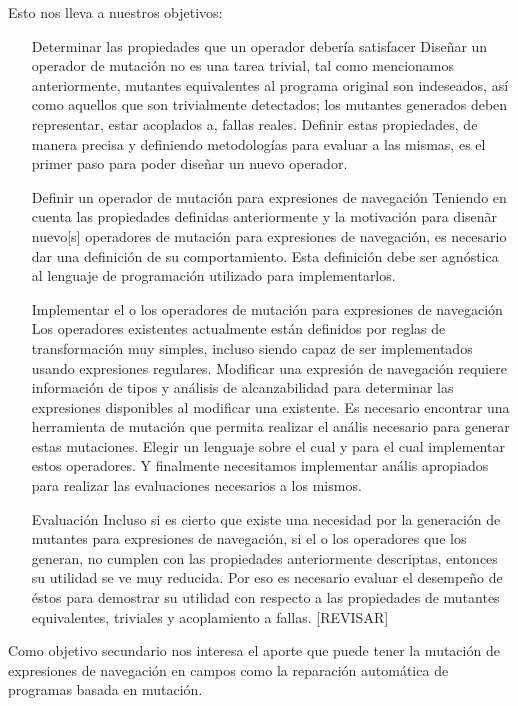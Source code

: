 Esto nos lleva a nuestros objetivos:

\begin{enumerate}[leftmargin=.75cm,align=left]
	\item[Determinar las propiedades que un operador deber\'ia satisfacer]
	Dise\~nar un operador de mutaci\'on no es una tarea trivial, tal como mencionamos anteriormente, mutantes equivalentes al programa original son indeseados, as\'i como aquellos que son trivialmente detectados; los mutantes generados deben representar, estar acoplados a, fallas reales. Definir estas propiedades, de manera precisa y definiendo metodolog\'ias para evaluar a las mismas, es el primer paso para poder dise\~nar un nuevo operador.
	\item[Definir un operador de mutaci\'on para expresiones de navegaci\'on]
	Teniendo en cuenta las propiedades definidas anteriormente y la motivaci\'on para disen\~ar nuevo[s] operadores de mutaci\'on para expresiones de navegaci\'on, es necesario dar una definici\'on de su comportamiento. Esta definici\'on debe ser agn\'ostica al lenguaje de programaci\'on utilizado para implementarlos.
	\item[Implementar el o los operadores de mutaci\'on para expresiones de navegaci\'on] Los operadores existentes actualmente est\'an definidos por reglas de transformaci\'on muy simples, incluso siendo capaz de ser implementados usando expresiones regulares. Modificar una expresi\'on de navegaci\'on requiere informaci\'on de tipos y an\'alisis de alcanzabilidad para determinar las expresiones disponibles al modificar una existente. Es necesario encontrar una herramienta de mutaci\'on que permita realizar el an\'alis necesario para generar estas mutaciones. Elegir un lenguaje sobre el cual y para el cual implementar estos operadores. Y finalmente necesitamos implementar an\'alis apropiados para realizar las evaluaciones necesarios a los mismos.
	\item[Evaluaci\'on]
	Incluso si es cierto que existe una necesidad por la generaci\'on de mutantes para expresiones de navegaci\'on, si el o los operadores que los generan, no cumplen con las propiedades anteriormente descriptas, entonces su utilidad se ve muy reducida. Por eso es necesario evaluar el desempe\~no de \'estos para demostrar su utilidad con respecto a las propiedades de mutantes equivalentes, triviales y acoplamiento a fallas. [REVISAR]
\end{enumerate}

Como objetivo secundario nos interesa el aporte que puede tener la mutaci\'on de expresiones de navegaci\'on en campos como la reparaci\'on autom\'atica de programas basada en mutaci\'on.

